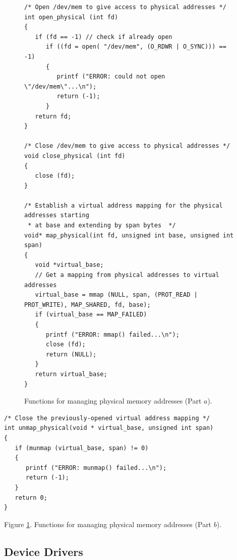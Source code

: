 \documentclass[11pt, twoside, pdftex]{article}
\begin{document}
\lstset{language=C,numbers=none}
\begin{figure}[H]
\begin{center}
\begin{minipage}[t]{16 cm}
\begin{lstlisting}
/* Open /dev/mem to give access to physical addresses */
int open_physical (int fd)
{
   if (fd == -1) // check if already open
      if ((fd = open( "/dev/mem", (O_RDWR | O_SYNC))) == -1)
      {
         printf ("ERROR: could not open \"/dev/mem\"...\n");
         return (-1);
      }
   return fd;
}

/* Close /dev/mem to give access to physical addresses */
void close_physical (int fd)
{
   close (fd);
}

/* Establish a virtual address mapping for the physical addresses starting 
 * at base and extending by span bytes  */
void* map_physical(int fd, unsigned int base, unsigned int span)
{
   void *virtual_base;
   // Get a mapping from physical addresses to virtual addresses
   virtual_base = mmap (NULL, span, (PROT_READ | PROT_WRITE), MAP_SHARED, fd, base);
   if (virtual_base == MAP_FAILED) 
   {
      printf ("ERROR: mmap() failed...\n");
      close (fd);
      return (NULL);
   }
   return virtual_base;
}
\end{lstlisting}
\end{minipage}
\end{center}
\vspace{-0.33in}\caption{Functions for managing physical memory addresses (Part $a$).}
\label{fig:functions}
\end{figure}

\lstset{language=C,numbers=none}
\begin{center}
\begin{minipage}[t]{12.5 cm}
\begin{lstlisting}
/* Close the previously-opened virtual address mapping */
int unmap_physical(void * virtual_base, unsigned int span)
{
   if (munmap (virtual_base, span) != 0) 
   {
      printf ("ERROR: munmap() failed...\n");
      return (-1);
   }
   return 0;
}
\end{lstlisting}
Figure \ref{fig:functions}. Functions for managing physical memory addresses (Part $b$).
\end{minipage}
\end{center}

\subsection{Device Drivers}
\label{sec:device_drivers}
\end{document}

